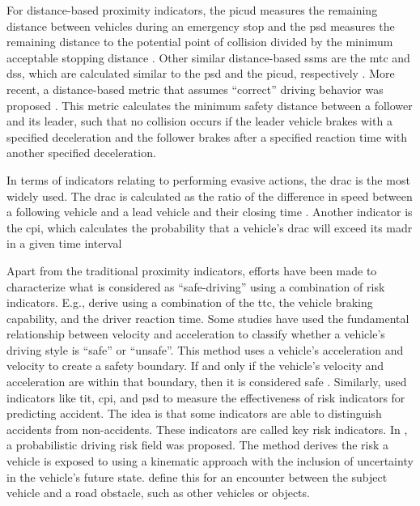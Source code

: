 For distance-based proximity indicators, the \ac{picud} measures the remaining distance between vehicles during an emergency stop \autocite{iida2001traffic, uno2003objective} and the \ac{psd} measures the remaining distance to the potential point of collision divided by the minimum acceptable stopping distance \autocite{allen1978analysis, guido2011comparing, mahmud2017application}. 
Other similar distance-based \acp{ssm} are the \ac{mtc} and \ac{dss}, which are calculated similar to the \ac{psd} and the \ac{picud}, respectively \autocite{kitajima2009estimation, okamura2011impact}. 
More recent, a distance-based metric that assumes ``correct'' driving behavior was proposed \autocite{shalev2017formal}. 
This metric calculates the minimum safety distance between a follower and its leader, such that no collision occurs if the leader vehicle brakes with a specified deceleration and the follower brakes after a specified reaction time with another specified deceleration. 

In terms of indicators relating to performing evasive actions, the \ac{drac} is the most widely used. 
The \ac{drac} is calculated as the ratio of the difference in speed between a following vehicle and a lead vehicle and their closing time \autocite{almqvist1991use, mahmud2017application}. 
Another indicator is the \ac{cpi}, which calculates the probability that a vehicle's \ac{drac} will exceed its \ac{madr} in a given time interval \autocite{cunto2009simulated} 


Apart from the traditional proximity indicators, efforts have been made to characterize what is considered as ``safe-driving'' using a combination of risk indicators.
E.g., \textcite{wang2014evaluation} derive  using a combination of the \ac{ttc}, the vehicle braking capability, and the driver reaction time.
Some studies have used the fundamental relationship between velocity and acceleration to classify whether a vehicle’s driving style  is ``safe'' or ``unsafe''. 
This method uses a vehicle's acceleration and velocity to create a safety boundary.
If and only if the vehicle's velocity and acceleration are within that boundary, then it is considered safe  \autocite{eboli2016combining}.
Similarly, \textcite{shi2018key} used indicators like \ac{tit}, \ac{cpi}, and \ac{psd} to measure the effectiveness of risk indicators for predicting accident. 
The idea is that some indicators are able to distinguish accidents from non-accidents. 
These indicators are called key risk indicators. 
In \autocite{mullakkal2020probabilistic}, a probabilistic driving risk field was proposed.
The method derives the risk a vehicle is exposed to using a kinematic approach with the inclusion of uncertainty in the vehicle's future state. 
\textcite{mullakkal2020probabilistic} define this for an encounter between the subject vehicle and a road obstacle, such as other vehicles or objects. 
